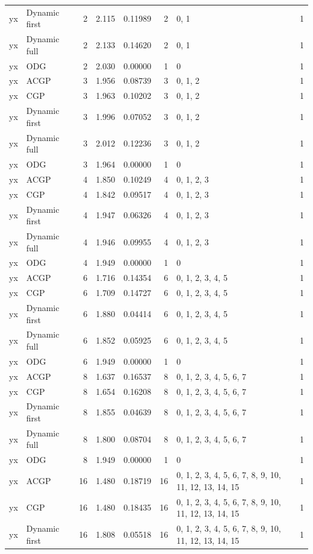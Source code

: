\documentclass[10pt,a4paper]{article}
\begin{document}
\begin{longtable}{@{}p{23mm}p{29mm}rrrrp{36mm}r@{}}
yx & Dynamic first & 2 & 2.115 & 0.11989 & 2 & 0, 1 & 1 \\
yx & Dynamic full & 2 & 2.133 & 0.14620 & 2 & 0, 1 & 1 \\
yx & ODG & 2 & 2.030 & 0.00000 & 1 & 0 & 1 \\
yx & ACGP & 3 & 1.956 & 0.08739 & 3 & 0, 1, 2 & 1 \\
yx & CGP & 3 & 1.963 & 0.10202 & 3 & 0, 1, 2 & 1 \\
yx & Dynamic first & 3 & 1.996 & 0.07052 & 3 & 0, 1, 2 & 1 \\
yx & Dynamic full & 3 & 2.012 & 0.12236 & 3 & 0, 1, 2 & 1 \\
yx & ODG & 3 & 1.964 & 0.00000 & 1 & 0 & 1 \\
yx & ACGP & 4 & 1.850 & 0.10249 & 4 & 0, 1, 2, 3 & 1 \\
yx & CGP & 4 & 1.842 & 0.09517 & 4 & 0, 1, 2, 3 & 1 \\
yx & Dynamic first & 4 & 1.947 & 0.06326 & 4 & 0, 1, 2, 3 & 1 \\
yx & Dynamic full & 4 & 1.946 & 0.09955 & 4 & 0, 1, 2, 3 & 1 \\
yx & ODG & 4 & 1.949 & 0.00000 & 1 & 0 & 1 \\
yx & ACGP & 6 & 1.716 & 0.14354 & 6 & 0, 1, 2, 3, 4, 5 & 1 \\
yx & CGP & 6 & 1.709 & 0.14727 & 6 & 0, 1, 2, 3, 4, 5 & 1 \\
yx & Dynamic first & 6 & 1.880 & 0.04414 & 6 & 0, 1, 2, 3, 4, 5 & 1 \\
yx & Dynamic full & 6 & 1.852 & 0.05925 & 6 & 0, 1, 2, 3, 4, 5 & 1 \\
yx & ODG & 6 & 1.949 & 0.00000 & 1 & 0 & 1 \\
yx & ACGP & 8 & 1.637 & 0.16537 & 8 & 0, 1, 2, 3, 4, 5, 6, 7 & 1 \\
yx & CGP & 8 & 1.654 & 0.16208 & 8 & 0, 1, 2, 3, 4, 5, 6, 7 & 1 \\
yx & Dynamic first & 8 & 1.855 & 0.04639 & 8 & 0, 1, 2, 3, 4, 5, 6, 7 & 1 \\
yx & Dynamic full & 8 & 1.800 & 0.08704 & 8 & 0, 1, 2, 3, 4, 5, 6, 7 & 1 \\
yx & ODG & 8 & 1.949 & 0.00000 & 1 & 0 & 1 \\
yx & ACGP & 16 & 1.480 & 0.18719 & 16 & 0, 1, 2, 3, 4, 5, 6, 7, 8, 9, 10, 11, 12, 13, 14, 15 & 1 \\
yx & CGP & 16 & 1.480 & 0.18435 & 16 & 0, 1, 2, 3, 4, 5, 6, 7, 8, 9, 10, 11, 12, 13, 14, 15 & 1 \\
yx & Dynamic first & 16 & 1.808 & 0.05518 & 16 & 0, 1, 2, 3, 4, 5, 6, 7, 8, 9, 10, 11, 12, 13, 14, 15 & 1 \\

\end{longtable}
\end{document}
